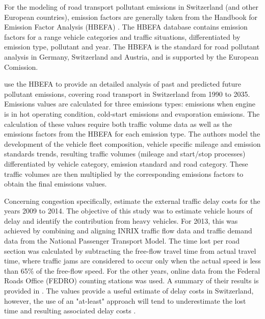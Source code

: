 For the modeling of road transport pollutant emissions in Switzerland (and other European countries), emission factors are generally taken from the Handbook for Emission Factor Analysis (HBEFA) \cite{maibach2008emissions}.
The HBEFA database contains emission factors for a range vehicle categories and traffic situations, differentiated by emission type, pollutant and year. The HBEFA is the standard for road pollutant analysis in Germany, Switzerland and Austria, and is supported by the European Comission. 

\citet{foen2010pollutants} use the HBEFA to provide an detailed analysis of past and predicted future pollutant emissions, covering road transport in Switzerland from 1990 to 2035.
Emissions values are calculated for three emissions types: emissions when engine is in hot operating condition, cold-start emissions and evaporation emissions.
The calculation of these values require both traffic volume data as well as the emissions factors from the HBEFA for each emission type.
The authors model the development of the vehicle fleet composition, vehicle specific mileage and emission standards trends, resulting 
traffic volumes (mileage and start/stop processes) differentiated by vehicle category, emission standard and road category.
These traffic volumes are then multiplied by the corresponding emissions factors to obtain the final emissions values.

Concerning congestion specifically, \cite{mkinfras2016staukosten} estimate the external traffic delay costs for the years 2009 to 2014.
The objective of this study was to estimate vehicle hours of delay and identify the contribution from heavy vehicles.
For 2013, this was achieved by combining and aligning INRIX traffic flow data and traffic demand data from the National Passenger Transport Model.
The time lost per road section was calculated by subtracting the free-flow travel time from actual travel time, where traffic jams are considered to occur only when the actual speed is less than 65\% of the free-flow speed.
For the other years, online data from the Federal Roads Office (FEDRO) counting stations was used.
A summary of their results is provided in .
The values provide a useful estimate of delay costs in Switzerland, however, the use of an "at-least" approach will tend to underestimate the lost time and resulting associated delay costs \cite{2016staukosten}.


